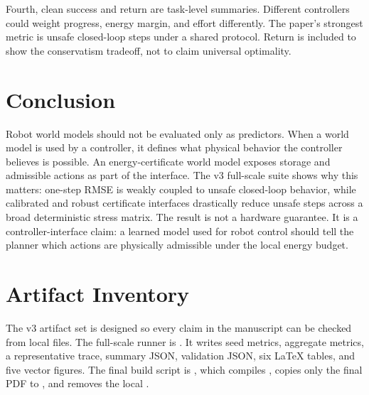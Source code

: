 \documentclass{article}
\begin{document}
Fourth, clean success and return are task-level summaries. Different controllers could weight progress, energy margin, and effort differently. The paper's strongest metric is unsafe closed-loop steps under a shared protocol. Return is included to show the conservatism tradeoff, not to claim universal optimality.

\section{Conclusion}

Robot world models should not be evaluated only as predictors. When a world model is used by a controller, it defines what physical behavior the controller believes is possible. An energy-certificate world model exposes storage and admissible actions as part of the interface. The v3 full-scale suite shows why this matters: one-step RMSE is weakly coupled to unsafe closed-loop behavior, while calibrated and robust certificate interfaces drastically reduce unsafe steps across a broad deterministic stress matrix. The result is not a hardware guarantee. It is a controller-interface claim: a learned model used for robot control should tell the planner which actions are physically admissible under the local energy budget.

\clearpage
\appendix
\setcounter{section}{0}
\renewcommand{\thesection}{A.\arabic{section}}

\section{Artifact Inventory}

The v3 artifact set is designed so every claim in the manuscript can be checked from local files. The full-scale runner is . It writes seed metrics, aggregate metrics, a representative trace, summary JSON, validation JSON, six LaTeX tables, and five vector figures. The final build script is , which compiles , copies only the final PDF to , and removes the local .
\end{document}
